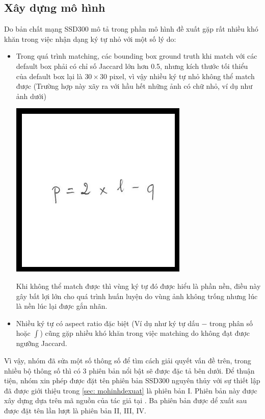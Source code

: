 \documentclass[a4paper]{article}
\theoremstyle{definition}
\begin{document}
	\newpage
	\subsection{Xây dựng mô hình}
	\label{subsec: xaydungmohinh}
	Do bản chất mạng SSD300\cite{liu2016ssd} mô tả trong phần mô hình đề xuất gặp rất nhiều khó khăn trong việc nhận dạng ký tự nhỏ với một số lý do:
	\begin{itemize}
		\item Trong quá trình matching, các bounding box ground truth khi match với các default box phải có chỉ số Jaccard\cite{Jaccard} lớn hơn 0.5, nhưng kích thước tối thiểu của default box lại là $30 \times 30$ pixel, vì vậy nhiều ký tự nhỏ không thể match được (Trường hợp này xãy ra với hầu hết những ảnh có chữ nhỏ, ví dụ như ảnh dưới)
		\begin{center}
			\centering
			\includegraphics[resolution=300]{HMER_2017_TEST1_MINH_01_2A.png}
			\vspace{0.5cm}
		\end{center}
		Khi không thể match được thì vùng ký tự đó được hiểu là phần nền, điều này gây bất lợi lớn cho quá trình huấn luyện do vùng ảnh không trống nhưng lúc là nền lúc lại được gắn nhãn.
		
		\item Nhiều ký tự có aspect ratio đặc biệt (Ví dụ như ký tự dấu $-$ trong phân số hoặc $\int$) cũng gặp nhiều khó khăn trong việc matching do không đạt được ngưỡng Jaccard\cite{Jaccard}.
	\end{itemize}
	Vì vậy, nhóm đã sửa một số thông số để tìm cách giải quyết vấn đề trên, trong nhiều bộ thông số thì có 3 phiên bản nổi bật sẽ được đặc tả bên dưới. Để thuận tiện, nhóm xin phép được đặt tên phiên bản SSD300 nguyên thủy\cite{liu2016ssd} với sự thiết lập đã được giới thiệu trong \ref{sec: mohinhdexuat} là phiên bản I. Phiên bản này được xây dựng dựa trên mã nguồn của tác giả tại \cite{github}. Ba phiên bản được dể xuất sau được đặt tên lần lượt là phiên bản II, III, IV.
	
\end{document}
